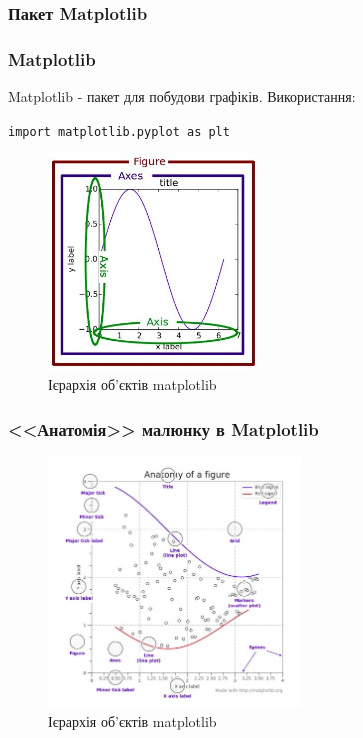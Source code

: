 \subsubsection{Пакет Matplotlib}
\begin{frame}
\frametitle{Matplotlib}
Matplotlib - пакет для побудови графіків. Використання:

\texttt{import matplotlib.pyplot as plt}

\begin{figure}
  \begin{center}
    \includegraphics[width=0.5\textwidth,height=0.5\textheight]{pictures/figure-matplotlib.jpg}
  \caption{Ієрархія об'єктів matplotlib}
\label{function}
  \end{center}
\end{figure}
\end{frame}

\begin{frame}
\frametitle{<<Анатомія>> малюнку в Matplotlib}

\begin{figure}
  \begin{center}
    \includegraphics[width=0.6\textwidth,height=0.7\textheight]{pictures/anatomy-matplotlib.jpg}
  \caption{Ієрархія об'єктів matplotlib}
\label{function}
  \end{center}
\end{figure}
\end{frame}

